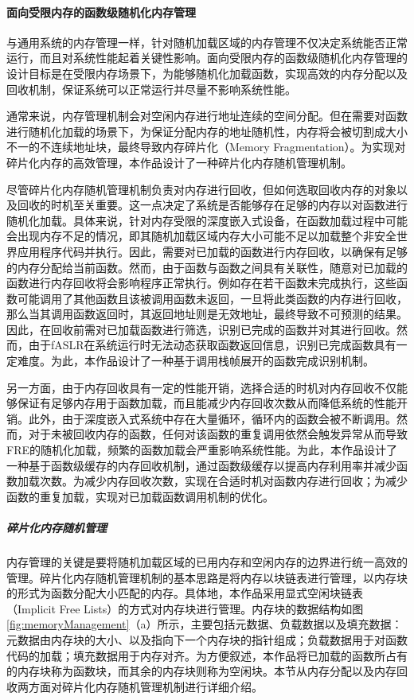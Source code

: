 \documentclass[12pt,a4paper]{ctexart}
\numberwithin{figure}{section}
\begin{document}
\paragraph{面向受限内存的函数级随机化内存管理}
\par 与通用系统的内存管理一样，针对随机加载区域的内存管理不仅决定系统能否正常运行，而且对系统性能起着关键性影响。面向受限内存的函数级随机化内存管理的设计目标是在受限内存场景下，为能够随机化加载函数，实现高效的内存分配以及回收机制，保证系统可以正常运行并尽量不影响系统性能。
\par 通常来说，内存管理机制会对空闲内存进行地址连续的空间分配。但在需要对函数进行随机化加载的场景下，为保证分配内存的地址随机性，内存将会被切割成大小不一的不连续地址块，最终导致内存碎片化（Memory Fragmentation）。为实现对碎片化内存的高效管理，本作品设计了一种碎片化内存随机管理机制。
\par 尽管碎片化内存随机管理机制负责对内存进行回收，但如何选取回收内存的对象以及回收的时机至关重要。这一点决定了系统是否能够存在足够的内存以对函数进行随机化加载。具体来说，针对内存受限的深度嵌入式设备，在函数加载过程中可能会出现内存不足的情况，即其随机加载区域内存大小可能不足以加载整个非安全世界应用程序代码并执行。因此，需要对已加载的函数进行内存回收，以确保有足够的内存分配给当前函数。然而，由于函数与函数之间具有关联性，随意对已加载的函数进行内存回收将会影响程序正常执行。例如存在若干函数未完成执行，这些函数可能调用了其他函数且该被调用函数未返回，一旦将此类函数的内存进行回收，那么当其调用函数返回时，其返回地址则是无效地址，最终导致不可预测的结果。因此，在回收前需对已加载函数进行筛选，识别已完成的函数并对其进行回收。然而，由于fASLR在系统运行时无法动态获取函数返回信息，识别已完成函数具有一定难度。为此，本作品设计了一种基于调用栈帧展开的函数完成识别机制。
\par 另一方面，由于内存回收具有一定的性能开销，选择合适的时机对内存回收不仅能够保证有足够内存用于函数加载，而且能减少内存回收次数从而降低系统的性能开销。此外，由于深度嵌入式系统中存在大量循环，循环内的函数会被不断调用。然而，对于未被回收内存的函数，任何对该函数的重复调用依然会触发异常从而导致FRE的随机化加载，频繁的函数加载会严重影响系统性能。为此，本作品设计了一种基于函数级缓存的内存回收机制，通过函数级缓存以提高内存利用率并减少函数加载次数。为减少内存回收次数，实现在合适时机对函数内存进行回收；为减少函数的重复加载，实现对已加载函数调用机制的优化。
\subparagraph{碎片化内存随机管理}
\par 内存管理的关键是要将随机加载区域的已用内存和空闲内存的边界进行统一高效的管理。碎片化内存随机管理机制的基本思路是将内存以块链表进行管理，以内存块的形式为函数分配大小匹配的内存。具体地，本作品采用显式空闲块链表（Implicit Free Lists）的方式对内存块进行管理。内存块的数据结构如图\ref{fig:memoryManagement}（a）所示，主要包括元数据、负载数据以及填充数据：元数据由内存块的大小、以及指向下一个内存块的指针组成；负载数据用于对函数代码的加载；填充数据用于内存对齐。为方便叙述，本作品将已加载的函数所占有的内存块称为函数块，而其余的内存块则称为空闲块。本节从内存分配以及内存回收两方面对碎片化内存随机管理机制进行详细介绍。
\end{document}
